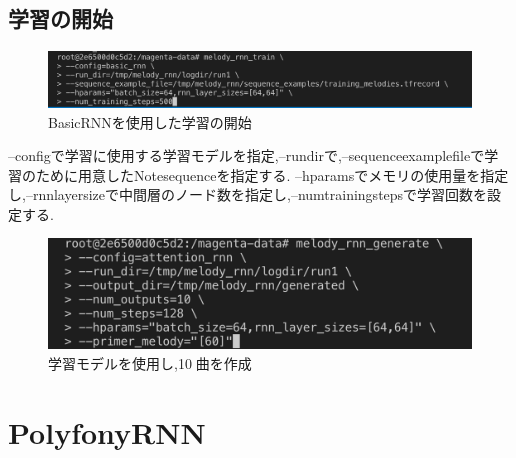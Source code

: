 \subsection{学習の開始}
\begin{figure}[!ht]
    \begin{screen}
    \begin{center}
        \includegraphics[scale=0.5, clip]{./img/Rnn_train.png}
        \caption{BasicRNNを使用した学習の開始}
        \label{fig:BasicRNNを使用した学習の開始}
    \end{center}
    \end{screen}
\end{figure}
--configで学習に使用する学習モデルを指定,--rundirで,--sequenceexamplefileで学習のために用意したNotesequenceを指定する.
--hparamsでメモリの使用量を指定し,--rnnlayersizeで中間層のノード数を指定し,--numtrainingstepsで学習回数を設定する.\\
\begin{figure}[!ht]
    \begin{screen}
    \begin{center}
        \includegraphics[scale=0.5, clip]{./img/MIDI_make.png}
        \caption{学習モデルを使用し,10曲を作成}
        \label{fig:学習モデルを使用し,10曲を作成}
    \end{center}
    \end{screen}
\end{figure}

\section{PolyfonyRNN}